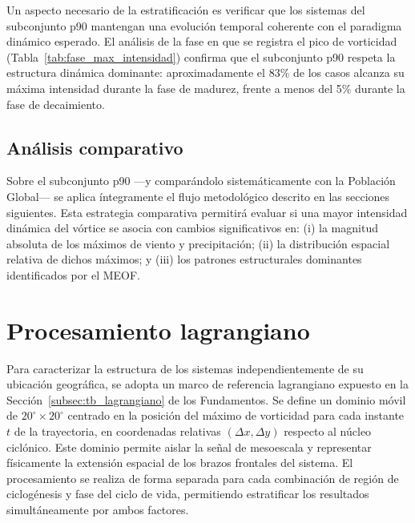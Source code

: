 

Un aspecto necesario de la estratificación es verificar que los sistemas del subconjunto p90 mantengan una evolución temporal coherente con el paradigma dinámico esperado. El análisis de la fase en que se registra el pico de vorticidad (Tabla~\ref{tab:fase_max_intensidad}) confirma que el subconjunto p90 respeta la estructura dinámica dominante: aproximadamente el 83\% de los casos alcanza su máxima intensidad durante la fase de madurez, frente a menos del 5\% durante la fase de decaimiento.



\subsection{Análisis comparativo}\label{subsec:estrategia_analise}

Sobre el subconjunto p90 ---y comparándolo sistemáticamente con la Población Global--- se aplica íntegramente el flujo metodológico descrito en las secciones siguientes. Esta estrategia comparativa permitirá evaluar si una mayor intensidad dinámica del vórtice se asocia con cambios significativos en: (i) la magnitud absoluta de los máximos de viento y precipitación; (ii) la distribución espacial relativa de dichos máximos; y (iii) los patrones estructurales dominantes identificados por el MEOF.


\section{Procesamiento lagrangiano}\label{sec:procesamiento_lagrangiano}

Para caracterizar la estructura de los sistemas independientemente de su ubicación geográfica, se adopta un marco de referencia lagrangiano expuesto en la Sección~\ref{subsec:tb_lagrangiano} de los Fundamentos. Se define un dominio móvil de $20^{\circ} \times 20^{\circ}$ centrado en la posición del máximo de vorticidad para cada instante $t$ de la trayectoria, en coordenadas relativas $(\Delta x, \Delta y)$ respecto al núcleo ciclónico. Este dominio permite aislar la señal de mesoescala y representar físicamente la extensión espacial de los brazos frontales del sistema. El procesamiento se realiza de forma separada para cada combinación de región de ciclogénesis y fase del ciclo de vida, permitiendo estratificar los resultados simultáneamente por ambos factores. 

